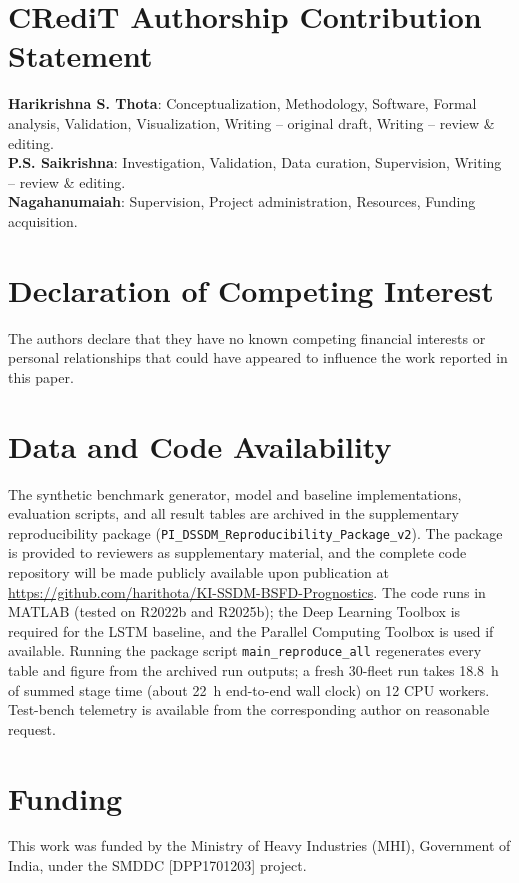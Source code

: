 \documentclass[a4paper,fleqn]{cas-dc}
\begin{document}

\section*{CRediT Authorship Contribution Statement}
\textbf{Harikrishna S. Thota}: Conceptualization, Methodology, Software, Formal analysis, Validation, Visualization, Writing -- original draft, Writing -- review \& editing. \\
\textbf{P.S. Saikrishna}: Investigation, Validation, Data curation, Supervision, Writing -- review \& editing. \\
\textbf{Nagahanumaiah}: Supervision, Project administration, Resources, Funding acquisition.

\section*{Declaration of Competing Interest}
The authors declare that they have no known competing financial interests or personal relationships that could have appeared to influence the work reported in this paper.

\section*{Data and Code Availability}
The synthetic benchmark generator, model and baseline implementations, evaluation scripts, and all result tables are archived in the supplementary reproducibility package (\texttt{PI\_DSSDM\_Reproducibility\_Package\_v2}). The package is provided to reviewers as supplementary material, and the complete code repository will be made publicly available upon publication at \url{https://github.com/harithota/KI-SSDM-BSFD-Prognostics}. The code runs in MATLAB (tested on R2022b and R2025b); the Deep Learning Toolbox is required for the LSTM baseline, and the Parallel Computing Toolbox is used if available. Running the package script \texttt{main\_reproduce\_all} regenerates every table and figure from the archived run outputs; a fresh 30-fleet run takes 18.8~h of summed stage time (about 22~h end-to-end wall clock) on 12 CPU workers. Test-bench telemetry is available from the corresponding author on reasonable request.

\section*{Funding}
This work was funded by the Ministry of Heavy Industries (MHI), Government of India, under the SMDDC [DPP1701203] project.
\end{document}
